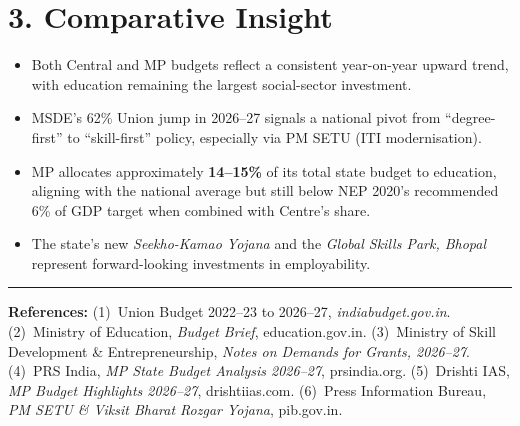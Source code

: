 \documentclass[11pt,a4paper]{article}
\begin{document}
\vspace{0.15cm}
\section{3. Comparative Insight}

\begin{itemize}
  \item Both Central and MP budgets reflect a consistent year-on-year upward trend, with education remaining the largest social-sector investment.
  \item MSDE's 62\% Union jump in 2026--27 signals a national pivot from ``degree-first'' to ``skill-first'' policy, especially via PM SETU (ITI modernisation).
  \item MP allocates approximately \textbf{14--15\%} of its total state budget to education, aligning with the national average but still below NEP 2020's recommended 6\% of GDP target when combined with Centre's share.
  \item The state's new \textit{Seekho-Kamao Yojana} and the \textit{Global Skills Park, Bhopal} represent forward-looking investments in employability.
\end{itemize}

\vspace{0.25cm}
\noindent\rule{\textwidth}{0.5pt}
{\scriptsize\textbf{References:}
(1)~Union Budget 2022--23 to 2026--27, \textit{indiabudget.gov.in}.
(2)~Ministry of Education, \textit{Budget Brief}, education.gov.in.
(3)~Ministry of Skill Development \& Entrepreneurship, \textit{Notes on Demands for Grants, 2026--27}.
(4)~PRS India, \textit{MP State Budget Analysis 2026--27}, prsindia.org.
(5)~Drishti IAS, \textit{MP Budget Highlights 2026--27}, drishtiias.com.
(6)~Press Information Bureau, \textit{PM SETU \& Viksit Bharat Rozgar Yojana}, pib.gov.in.
}
\end{document}
